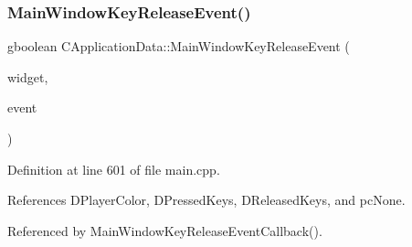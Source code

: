 \subsubsection{\texorpdfstring{Main\+Window\+Key\+Release\+Event()}{MainWindowKeyReleaseEvent()}}
{\footnotesize\ttfamily gboolean C\+Application\+Data\+::\+Main\+Window\+Key\+Release\+Event (\begin{DoxyParamCaption}\item[{Gtk\+Widget $\ast$}]{widget,  }\item[{Gdk\+Event\+Key $\ast$}]{event }\end{DoxyParamCaption})\hspace{0.3cm}{\ttfamily [protected]}}



Definition at line 601 of file main.\+cpp.



References D\+Player\+Color, D\+Pressed\+Keys, D\+Released\+Keys, and pc\+None.



Referenced by Main\+Window\+Key\+Release\+Event\+Callback().


